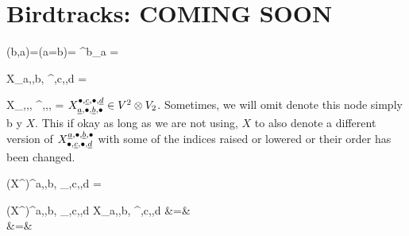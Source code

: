 \chapter{Birdtracks: COMING SOON}
\label{ch-birdtracks}

\beq
\delta(b,a)=\indi(a=b)=
\delta^b_a =
\eeq

\beq
X_{a,\bullet,b, \bullet}^{\bullet,c,\bullet,d}
=
\bcen
{}\ecen
\eeq

\beq
{}
X_{\rva,\bullet,\rvb, \bullet}^{\bullet,\rvc,\bullet,\rvd}
=
\bcen
{}\ecen
\rarrow
\bcen
{}\ecen
\eeq
$X_{\rva,\bullet,\rvb, \bullet}
^{\bullet,\rvc,\bullet,\rvd}\in V^2 \otimes V_2$.
Sometimes, 
we will omit denote
this node simply b y $X$.
This if okay as long as
we are not using,
$X$ to also denote
a different version of $X^{\rva,\bullet,\rvb, \bullet}
_{\bullet,\rvc,\bullet,\rvd}$
with some of the indices
raised or lowered or 
their order has been changed.

\beq
(X^\dagger)^{a,\bullet,b, \bullet}_{\bullet,c,\bullet,d}
=
\bcen
{}\ecen
\eeq


\beqa
(X^\dagger)^{a,\bullet,b, \bullet}_{\bullet,c,\bullet,d}
X_{a,\bullet,b, \bullet}^{\bullet,c,\bullet,d}
&=&
\bcen
{}
\ecen
\\
&=&
\bcen
{}
\ecen
\eeqa


